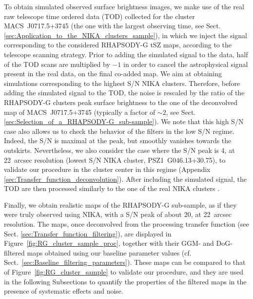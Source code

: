 \documentclass[traditabstract]{aa}
\begin{document}
To obtain simulated observed surface brightness images, we make use of the real raw telescope time ordered data (TOD) collected for the cluster \mbox{MACS~J0717.5+3745} (the one with the largest observing time, see Sect. \ref{sec:Application_to_the_NIKA_clusters_sample}), in which we inject the signal corresponding to the considered RHAPSODY-G tSZ maps, according to the telescope scanning strategy. Prior to adding the simulated signal to the data, half of the TOD scans are multiplied by $-1$ in order to cancel the astrophysical signal present in the real data, on the final co-added map. We aim at obtaining simulations corresponding to the highest S/N NIKA clusters. Therefore, before adding the simulated signal to the TOD, the noise is rescaled by the ratio of the RHAPSODY-G clusters peak surface brightness to the one of the deconvolved map of \mbox{MACS~J0717.5+3745} (typically a factor of $\sim 2$, see Sect. \ref{sec:Selection_of_a_RHAPSODY-G_sub-sample}). We note that this high S/N case also allows us to check the behavior of the filters in the low S/N regime. Indeed, the S/N is maximal at the peak, but smoothly vanishes towards the outskirts. Nevertheless, we also consider the case where the S/N peak is 4, at 22~arcsec resolution (lowest S/N NIKA cluster, \mbox{PSZ1~G046.13+30.75}), to validate our procedure in the cluster center in this regime (Appendix \ref{sec:Transfer_function_deconvolution}). After including the simulated signal, the TOD are then processed similarly to the one of the real NIKA clusters \citep[see][for more details]{Adam2015}.

Finally, we obtain realistic maps of the RHAPSODY-G sub-sample, as if they were truly observed using NIKA, with a S/N peak of about 20, at 22~arcsec resolution. The maps, once deconvolved from the processing transfer function (see Sect. \ref{sec:Transfer_function_filtering}), are displayed in Figure~\ref{fig:RG_cluster_sample_proc}, together with their GGM- and DoG-filtered maps obtained using our baseline parameter values (cf. Sect.~\ref{sec:Baseline_filtering_parameters}). These maps can be compared to that of Figure~\ref{fig:RG_cluster_sample} to validate our procedure, and they are used in the following Subsections to quantify the properties of the filtered maps in the presence of systematic effects and noise.

\end{document}
